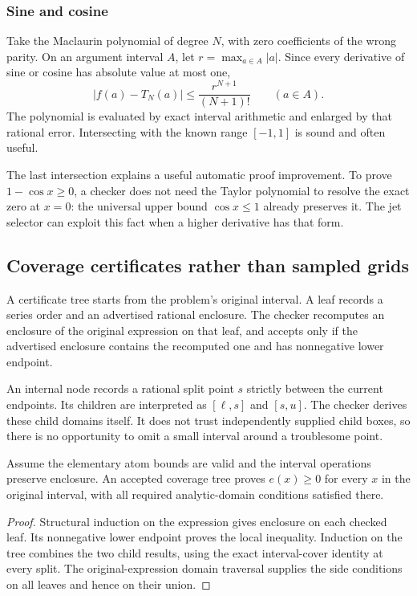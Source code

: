 \subsubsection{Sine and cosine}
Take the Maclaurin polynomial of degree \(N\), with zero coefficients of the wrong parity. On an argument interval \(A\), let \(r=\max_{a\in A}|a|\). Since every derivative of sine or cosine has absolute value at most one,
\begin{equation}\label{eq:trig-error}
 |f(a)-T_N(a)|\le\frac{r^{N+1}}{(N+1)!}
 \qquad(a\in A).
\end{equation}
The polynomial is evaluated by exact interval arithmetic and enlarged by that rational error. Intersecting with the known range \([-1,1]\) is sound and often useful.

The last intersection explains a useful automatic proof improvement. To prove \(1-\cos x\ge0\), a checker does not need the Taylor polynomial to resolve the exact zero at \(x=0\): the universal upper bound \(\cos x\le1\) already preserves it. The jet selector can exploit this fact when a higher derivative has that form.

\subsection{Coverage certificates rather than sampled grids}
A certificate tree starts from the problem's original interval. A leaf records a series order and an advertised rational enclosure. The checker recomputes an enclosure of the original expression on that leaf, and accepts only if the advertised enclosure contains the recomputed one and has nonnegative lower endpoint.

An internal node records a rational split point \(s\) strictly between the current endpoints. Its children are interpreted as \([\ell,s]\) and \([s,u]\). The checker derives these child domains itself. It does not trust independently supplied child boxes, so there is no opportunity to omit a small interval around a troublesome point.

\begin{theorem}\label{thm:interval}
Assume the elementary atom bounds are valid and the interval operations preserve enclosure. An accepted coverage tree proves \(e(x)\ge0\) for every \(x\) in the original interval, with all required analytic-domain conditions satisfied there.
\end{theorem}
\begin{proof}
Structural induction on the expression gives enclosure on each checked leaf. Its nonnegative lower endpoint proves the local inequality. Induction on the tree combines the two child results, using the exact interval-cover identity at every split. The original-expression domain traversal supplies the side conditions on all leaves and hence on their union.
\end{proof}

